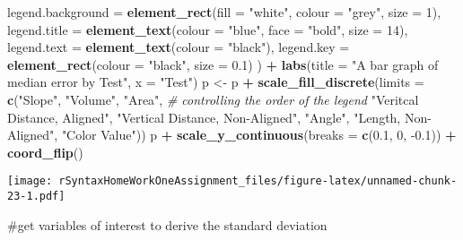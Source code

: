 \documentclass[
]{article}
\newenvironment{Shaded}{\begin{snugshade}}{\end{snugshade}}
\newcommand{\CommentTok}[1]{\textcolor[rgb]{0.56,0.35,0.01}{\textit{#1}}}
\newcommand{\DataTypeTok}[1]{\textcolor[rgb]{0.13,0.29,0.53}{#1}}
\newcommand{\DecValTok}[1]{\textcolor[rgb]{0.00,0.00,0.81}{#1}}
\newcommand{\FloatTok}[1]{\textcolor[rgb]{0.00,0.00,0.81}{#1}}
\newcommand{\KeywordTok}[1]{\textcolor[rgb]{0.13,0.29,0.53}{\textbf{#1}}}
\newcommand{\NormalTok}[1]{#1}
\newcommand{\OperatorTok}[1]{\textcolor[rgb]{0.81,0.36,0.00}{\textbf{#1}}}
\newcommand{\StringTok}[1]{\textcolor[rgb]{0.31,0.60,0.02}{#1}}
\begin{document}
\begin{Shaded}
\begin{Highlighting}[]
        \DataTypeTok{legend.background =} \KeywordTok{element_rect}\NormalTok{(}\DataTypeTok{fill =} \StringTok{"white"}\NormalTok{, }\DataTypeTok{colour =} \StringTok{"grey"}\NormalTok{, }\DataTypeTok{size =} \DecValTok{1}\NormalTok{), }
        \DataTypeTok{legend.title =} \KeywordTok{element_text}\NormalTok{(}\DataTypeTok{colour =} \StringTok{"blue"}\NormalTok{, }\DataTypeTok{face =} \StringTok{"bold"}\NormalTok{, }\DataTypeTok{size =} \DecValTok{14}\NormalTok{),}
        \DataTypeTok{legend.text =} \KeywordTok{element_text}\NormalTok{(}\DataTypeTok{colour =} \StringTok{"black"}\NormalTok{), }
        \DataTypeTok{legend.key =} \KeywordTok{element_rect}\NormalTok{(}\DataTypeTok{colour =} \StringTok{"black"}\NormalTok{, }\DataTypeTok{size =} \FloatTok{0.1}\NormalTok{)}
\NormalTok{  ) }\OperatorTok{+}\StringTok{ }
\StringTok{  }\KeywordTok{labs}\NormalTok{(}\DataTypeTok{title =} \StringTok{"A bar graph of median error by Test"}\NormalTok{, }\DataTypeTok{x =} \StringTok{"Test"}\NormalTok{)}
\NormalTok{p <-}\StringTok{ }\NormalTok{p }\OperatorTok{+}\StringTok{ }\KeywordTok{scale_fill_discrete}\NormalTok{(}\DataTypeTok{limits =} \KeywordTok{c}\NormalTok{(}\StringTok{"Slope"}\NormalTok{, }\StringTok{"Volume"}\NormalTok{, }\StringTok{"Area"}\NormalTok{,  }\CommentTok{# controlling the order of the legend}
                                   \StringTok{"Veritcal Distance, Aligned"}\NormalTok{, }
                                   \StringTok{"Vertical Distance, Non-Aligned"}\NormalTok{, }
                                   \StringTok{"Angle"}\NormalTok{, }\StringTok{"Length, Non-Aligned"}\NormalTok{, }\StringTok{"Color Value"}\NormalTok{)) }
\NormalTok{p }\OperatorTok{+}\StringTok{ }\KeywordTok{scale_y_continuous}\NormalTok{(}\DataTypeTok{breaks =} \KeywordTok{c}\NormalTok{(}\FloatTok{0.1}\NormalTok{, }\DecValTok{0}\NormalTok{, }\FloatTok{-0.1}\NormalTok{)) }\OperatorTok{+}\StringTok{ }\KeywordTok{coord_flip}\NormalTok{()}
\end{Highlighting}
\end{Shaded}

\texttt{[image: rSyntaxHomeWorkOneAssignment\_files/figure-latex/unnamed-chunk-23-1.pdf]}

\#get variables of interest to derive the standard deviation

\begin{Shaded}
\end{Shaded}
\end{document}
